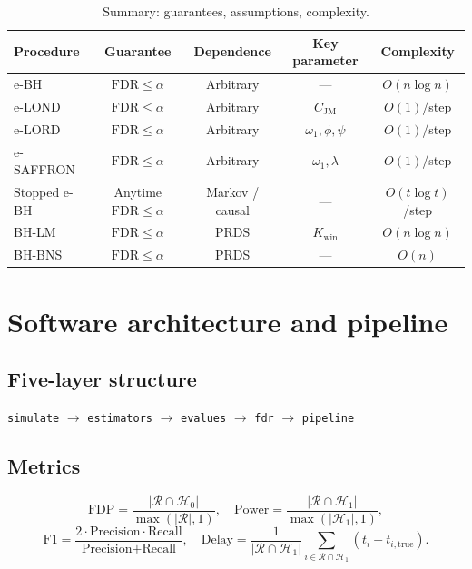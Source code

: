 \documentclass[11pt,a4paper]{article}
\theoremstyle{plain}
\theoremstyle{definition}
\theoremstyle{remark}
\newcommand{\FDR}{\mathrm{FDR}}
\newcommand{\FDP}{\mathrm{FDP}}
\begin{document}
\begin{table}[H]
\centering
\caption{Summary: guarantees, assumptions, complexity.}
\label{tab:procs_detail}
\begin{tabular}{lcccc}
\toprule
Procedure & Guarantee & Dependence & Key parameter & Complexity \\
\midrule
e-BH & $\FDR \le \alpha$ & Arbitrary & --- & $O(n\log n)$ \\
e-LOND & $\FDR \le \alpha$ & Arbitrary & $C_\mathrm{JM}$ & $O(1)$/step \\
e-LORD & $\FDR \le \alpha$ & Arbitrary & $\omega_1, \phi, \psi$ & $O(1)$/step \\
e-SAFFRON & $\FDR \le \alpha$ & Arbitrary & $\omega_1, \lambda$ & $O(1)$/step \\
Stopped e-BH & Anytime $\FDR \le \alpha$ & Markov / causal & --- & $O(t\log t)$/step \\
BH-LM & $\FDR \le \alpha$ & PRDS & $K_\mathrm{win}$ & $O(n\log n)$ \\
BH-BNS & $\FDR \le \alpha$ & PRDS & --- & $O(n)$ \\
\bottomrule
\end{tabular}
\end{table}


\section{Software architecture and pipeline}
\label{sec:pipeline}

\subsection{Five-layer structure}

\begin{center}
\texttt{simulate} $\to$ \texttt{estimators} $\to$ \texttt{evalues} $\to$
\texttt{fdr} $\to$ \texttt{pipeline}
\end{center}


\subsection{Metrics}

\[
  \FDP = \frac{|\mathcal{R} \cap \mathcal{H}_0|}{\max(|\mathcal{R}|, 1)},
  \quad
  \text{Power} = \frac{|\mathcal{R} \cap \mathcal{H}_1|}{\max(|\mathcal{H}_1|, 1)},
\]
\[
  \text{F1} = \frac{2 \cdot \text{Precision} \cdot \text{Recall}}{\text{Precision} + \text{Recall}},
  \quad
  \text{Delay} = \frac{1}{|\mathcal{R} \cap \mathcal{H}_1|}
    \sum_{i \in \mathcal{R} \cap \mathcal{H}_1}(t_i - t_{i,\text{true}}).
\]
\end{document}
